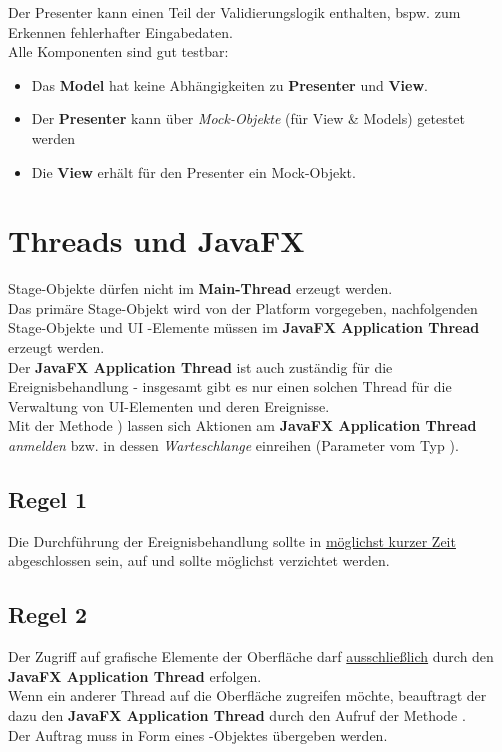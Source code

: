 \noindent
Der Presenter kann einen Teil der Validierungslogik enthalten, bspw. zum Erkennen fehlerhafter Eingabedaten.\\

\noindent
Alle Komponenten sind gut testbar:

\begin{itemize}
    \item Das \textbf{Model} hat keine Abhängigkeiten zu \textbf{Presenter} und \textbf{View}.
    \item Der \textbf{Presenter} kann über \textit{Mock-Objekte} (für View \& Models) getestet werden
    \item Die \textbf{View} erhält für den Presenter ein Mock-Objekt.
\end{itemize}

\section{Threads und JavaFX}

Stage-Objekte dürfen nicht im \textbf{Main-Thread} erzeugt werden. \\
Das primäre Stage-Objekt wird von der Platform vorgegeben, nachfolgenden Stage-Objekte und UI -Elemente müssen im \textbf{JavaFX Application Thread} erzeugt werden.\\

\noindent
Der \textbf{JavaFX Application Thread} ist auch zuständig für die Ereignisbehandlung - insgesamt gibt es nur einen solchen Thread für die Verwaltung von UI-Elementen und deren Ereignisse. \\

\noindent
Mit der Methode ) lassen sich Aktionen am \textbf{JavaFX Application Thread} \textit{anmelden} bzw. in dessen \textit{Warteschlange} einreihen (Parameter vom Typ ).\\

\subsection*{Regel 1}
Die Durchführung der Ereignisbehandlung sollte in \ul{möglichst kurzer Zeit} abgeschlossen sein, auf  und  sollte möglichst verzichtet werden.

\subsection*{Regel 2}
Der Zugriff auf grafische Elemente der Oberfläche darf \ul{ausschließlich} durch den \textbf{JavaFX Application Thread} erfolgen.\\
Wenn ein anderer Thread auf die Oberfläche zugreifen möchte, beauftragt der dazu den \textbf{JavaFX Application Thread} durch den Aufruf der Methode .\\
Der Auftrag muss in Form eines -Objektes übergeben werden.\\

